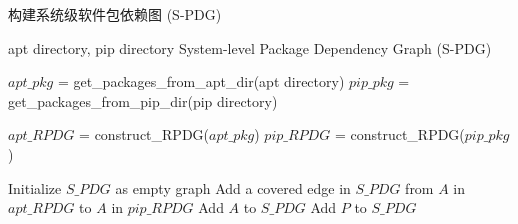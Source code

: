 \begin{algorithm}[htbp]
	\caption{构建系统级软件包依赖图 (S-PDG)}
	\label{alg:BuildSPDG}
	\begin{algorithmic}[1]
		\REQUIRE apt directory, pip directory
		\ENSURE System-level Package Dependency Graph (S-PDG)
		
		\STATE $apt\_pkg$ = get\_packages\_from\_apt\_dir(apt directory)
		\STATE $pip\_pkg$ = get\_packages\_from\_pip\_dir(pip directory)
		
		\STATE $apt\_RPDG$ = construct\_RPDG($apt\_pkg$)
		\STATE $pip\_RPDG$ = construct\_RPDG($pip\_pkg$)
		
		\STATE Initialize $S\_PDG$ as empty graph
		\STATE Add a covered edge in $S\_PDG$ from $A$ in $apt\_RPDG$ to $A$ in $pip\_RPDG$
		\ELSE
		\STATE Add $A$ to $S\_PDG$
		\ENDIF
		\ENDFOR
		\STATE Add $P$ to $S\_PDG$
		\ENDFOR
	\end{algorithmic}
\end{algorithm}
